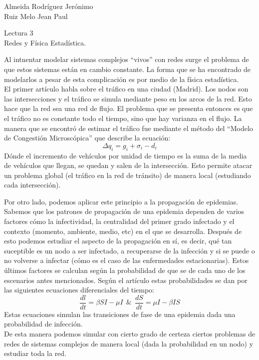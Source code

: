 \documentclass[a4paper, 12pt]{report}
\begin{document}
\begin{flushright}
    Almeida Rodríguez Jerónimo\\
    Ruiz Melo Jean Paul
\end{flushright}

\begin{center}
    {\LARGE Lectura 3}\\
    {\LARGE Redes y Física Estadística.}
\end{center}

Al intnentar modelar sistemas complejos ``vivos'' con redes surge el problema de
que estos sistemas están en cambio constante. La forma que se ha encontrado de
modelarlos a pesar de esta complicación es por medio de la física estadística.\\

El primer artículo habla sobre el tráfico en una ciudad (Madrid). Los nodos son
las intersecciones y el tráfico se simula mediante peso en los arcos de la red.
Esto hace que la red sea una red de flujo. El problema que se presenta entonces
es que el tráfico no es constante todo el tiempo, sino que hay varianza en el
flujo. La manera que se encontró de estimar el tráfico fue mediante el método
del ``Modelo de Congestión Microscópica'' que describe la ecuación:
$$ \Delta q_i = g_i+\sigma_i-d_i$$
Dónde el incremento de vehículos por unidad de tiempo es la suma de la media de
vehículos que llegan, se quedan y salen de la intersección. Esto permite atacar
un problema global (el tráfico en la red de tránsito) de manera local
(estudiando cada intersección).

Por otro lado, podemos aplicar este principio a la propagación de epidemias.
Sabemos que los patrones de propagación de una epidemia dependen de varios
factores cómo la infectividad, la centralidad del primer grado infectado y el
contexto (momento, ambiente, medio, etc) en el que se desarrolla. Después de
esto podemos estudiar el aspecto de la propagación en sí, es decir, qué tan
suceptible es un nodo a ser infectado, a recuperarse de la infección y si se
puede o no volverse a infectar  (cómo es el caso de las enfermedades
estacionarias). Estos últimos factores se calculan según la probabilidad de que
se de cada uno de los escenarios antes mencionados. Según el artículo estas
probabilidades se dan por las siguientes ecuaciones diferenciales del tiempo:
$$ \frac{dl}{dt}=\beta SI-\mu I \ \ \& \ \ \frac{dS}{dt}=\mu I-\beta IS$$
Estas ecuaciones simulan las transiciones de fase de una epidemia dada una
probabilidad de infección.\\

De esta manera podemos simular con cierto grado de certeza ciertos problemas
de redes de sistemas complejos de manera local (dada la probabilidad en un nodo)
y estudiar toda la red.
\end{document}
